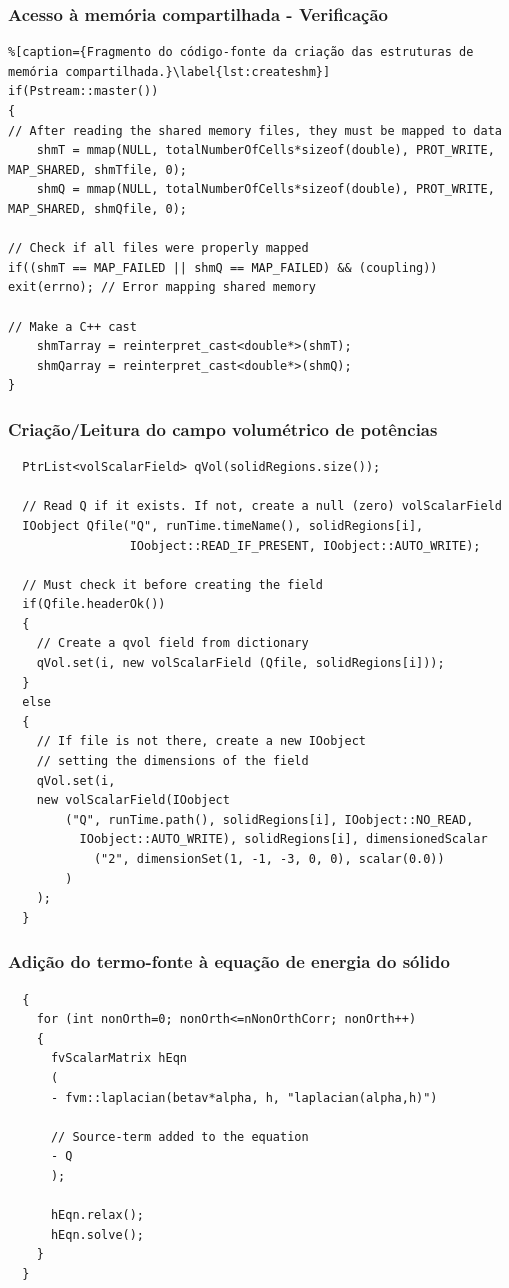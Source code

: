 \documentclass[svgnames,smaller,table]{beamer}
\begin{document}
\begin{frame}[fragile]
  \frametitle{Acesso à memória compartilhada - Verificação}
 \begin{lstlisting}%[caption={Fragmento do código-fonte da criação das estruturas de memória compartilhada.}\label{lst:createshm}]
if(Pstream::master())
{
// After reading the shared memory files, they must be mapped to data
    shmT = mmap(NULL, totalNumberOfCells*sizeof(double), PROT_WRITE, MAP_SHARED, shmTfile, 0);
    shmQ = mmap(NULL, totalNumberOfCells*sizeof(double), PROT_WRITE, MAP_SHARED, shmQfile, 0);

// Check if all files were properly mapped
if((shmT == MAP_FAILED || shmQ == MAP_FAILED) && (coupling)) exit(errno); // Error mapping shared memory

// Make a C++ cast
    shmTarray = reinterpret_cast<double*>(shmT);
    shmQarray = reinterpret_cast<double*>(shmQ);
}
 \end{lstlisting}
\end{frame}

\begin{frame}[fragile]
  \frametitle{Criação/Leitura do campo volumétrico de potências}
 \begin{lstlisting}
  PtrList<volScalarField> qVol(solidRegions.size());

  // Read Q if it exists. If not, create a null (zero) volScalarField
  IOobject Qfile("Q", runTime.timeName(), solidRegions[i],
                 IOobject::READ_IF_PRESENT, IOobject::AUTO_WRITE);

  // Must check it before creating the field
  if(Qfile.headerOk())
  {
    // Create a qvol field from dictionary
    qVol.set(i, new volScalarField (Qfile, solidRegions[i]));
  }
  else
  {
    // If file is not there, create a new IOobject
    // setting the dimensions of the field
    qVol.set(i,
    new volScalarField(IOobject
        ("Q", runTime.path(), solidRegions[i], IOobject::NO_READ,
          IOobject::AUTO_WRITE), solidRegions[i], dimensionedScalar
            ("2", dimensionSet(1, -1, -3, 0, 0), scalar(0.0))
        )
    );
  }
 \end{lstlisting}
\end{frame}

\begin{frame}[fragile]
  \frametitle{Adição do termo-fonte à equação de energia do sólido}
 \begin{lstlisting}
  {
    for (int nonOrth=0; nonOrth<=nNonOrthCorr; nonOrth++)
    {
      fvScalarMatrix hEqn
      (
      - fvm::laplacian(betav*alpha, h, "laplacian(alpha,h)")

      // Source-term added to the equation
      - Q
      );

      hEqn.relax();
      hEqn.solve();
    }
  }
 \end{lstlisting}
\end{frame}
\end{document}
